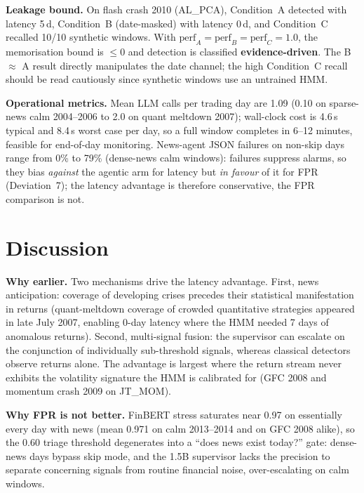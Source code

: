 \documentclass[10pt,a4paper]{article}
\begin{document}
\textbf{Leakage bound.} On flash crash 2010 (AL\_PCA), Condition~A detected
with latency 5\,d, Condition~B (date-masked) with latency 0\,d, and
Condition~C recalled 10/10 synthetic windows. With
$\text{perf}_A = \text{perf}_B = \text{perf}_C = 1.0$, the memorisation bound
is $\leq 0$ and detection is classified \textbf{evidence-driven}. The B
$\approx$ A result directly manipulates the date channel; the high Condition~C
recall should be read cautiously since synthetic windows use an untrained HMM.

\textbf{Operational metrics.} Mean LLM calls per trading day are 1.09 (0.10 on
sparse-news calm 2004--2006 to 2.0 on quant meltdown 2007); wall-clock cost is
4.6\,s typical and 8.4\,s worst case per day, so a full window completes in
6--12 minutes, feasible for end-of-day monitoring. News-agent JSON failures on
non-skip days range from 0\% to 79\% (dense-news calm windows): failures
suppress alarms, so they bias \emph{against} the agentic arm for latency but
\emph{in favour} of it for FPR (Deviation~7); the latency advantage is
therefore conservative, the FPR comparison is not.

\section{Discussion}\label{sec:discussion}

\textbf{Why earlier.} Two mechanisms drive the latency advantage. First, news
anticipation: coverage of developing crises precedes their statistical
manifestation in returns (quant-meltdown coverage of crowded quantitative
strategies appeared in late July 2007, enabling 0-day latency where the HMM
needed 7 days of anomalous returns). Second, multi-signal fusion: the
supervisor can escalate on the conjunction of individually sub-threshold
signals, whereas classical detectors observe returns alone. The advantage is
largest where the return stream never exhibits the volatility signature the
HMM is calibrated for (GFC 2008 and momentum crash 2009 on JT\_MOM).

\textbf{Why FPR is not better.} FinBERT stress saturates near 0.97 on
essentially every day with news (mean 0.971 on calm 2013--2014 and on GFC
2008 alike), so the 0.60 triage threshold degenerates into a ``does news exist
today?'' gate: dense-news days bypass skip mode, and the 1.5B supervisor lacks
the precision to separate concerning signals from routine financial noise,
over-escalating on calm windows.
\end{document}
